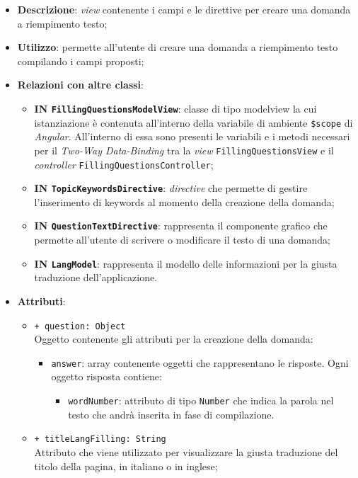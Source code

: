 \begin{itemize}
	\item \textbf{Descrizione}: \textit{view} contenente i campi e le direttive per creare una domanda a riempimento testo;
	\item \textbf{Utilizzo}:  permette all'utente di creare una domanda a riempimento testo compilando i campi proposti;
	\item \textbf{Relazioni con altre classi}:
	\begin{itemize}
		\item \textbf{IN \texttt{FillingQuestionsModelView}}: classe di tipo modelview la cui istanziazione è contenuta all'interno della variabile di ambiente \texttt{\$scope} di \textit{Angular}. All'interno di essa sono presenti le variabili e i metodi necessari per il \textit{Two-Way Data-Binding} tra la \textit{view} \texttt{FillingQuestionsView} e il \textit{controller} \texttt{FillingQuestionsController};
		\item \textbf{IN \texttt{TopicKeywordsDirective}}: \textit{directive} che permette di gestire l'inserimento di keywords al momento della creazione della domanda;
		\item \textbf{IN \texttt{QuestionTextDirective}}: rappresenta il componente grafico che permette all'utente di scrivere o modificare il testo di una domanda;
		\item \textbf{IN \texttt{LangModel}}: rappresenta il modello delle informazioni per la giusta traduzione dell'applicazione.
	\end{itemize}
	\item \textbf{Attributi}:
	\begin{itemize}
		\item \texttt{+ question: Object} \\ Oggetto contenente gli attributi per la creazione della domanda:
		\begin{itemize}
			\item \texttt{answer}: array contenente oggetti che rappresentano le risposte. Ogni oggetto risposta contiene:
				\begin{itemize}
					\item \texttt{wordNumber}: attributo di tipo \texttt{Number} che indica la parola nel testo che andrà inserita in fase di compilazione.
				\end{itemize}
		\end{itemize}
		\item \texttt{+ titleLangFilling: String} \\ Attributo che viene utilizzato per visualizzare la giusta traduzione del titolo della pagina, in italiano o in inglese;

\end{itemize}
\end{itemize}
